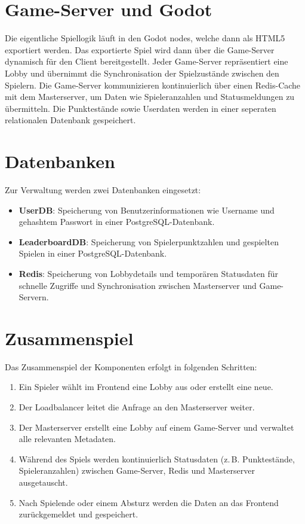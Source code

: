 \section{Game-Server und Godot}
Die eigentliche Spiellogik läuft in den Godot nodes, welche dann als HTML5 exportiert werden.
Das exportierte Spiel wird dann über die Game-Server dynamisch für den Client bereitgestellt. 
Jeder Game-Server repräsentiert eine Lobby und übernimmt die Synchronisation der Spielzustände zwischen den Spielern. 
Die Game-Server kommunizieren kontinuierlich über einen Redis-Cache mit dem Masterserver, um Daten wie Spieleranzahlen und Statusmeldungen zu übermitteln.
Die Punktestände sowie Userdaten werden in einer seperaten relationalen Datenbank gespeichert.

\section{Datenbanken}
Zur Verwaltung werden zwei Datenbanken eingesetzt:
\begin{itemize}
  \item \textbf{UserDB}: Speicherung von Benutzerinformationen wie Username und gehashtem Passwort in einer PostgreSQL-Datenbank. 
  \item \textbf{LeaderboardDB}: Speicherung von Spielerpunktzahlen und gespielten Spielen in einer PostgreSQL-Datenbank.
  \item \textbf{Redis}: Speicherung von Lobbydetails und temporären Statusdaten für schnelle Zugriffe und Synchronisation zwischen Masterserver und Game-Servern.
\end{itemize}

\section{Zusammenspiel}
Das Zusammenspiel der Komponenten erfolgt in folgenden Schritten:
\begin{enumerate}
  \item Ein Spieler wählt im Frontend eine Lobby aus oder erstellt eine neue.
  \item Der Loadbalancer leitet die Anfrage an den Masterserver weiter.
  \item Der Masterserver erstellt eine Lobby auf einem Game-Server und verwaltet alle relevanten Metadaten.
  \item Während des Spiels werden kontinuierlich Statusdaten (z.\,B. Punktestände, Spieleranzahlen) zwischen Game-Server, Redis und Masterserver ausgetauscht.
  \item Nach Spielende oder einem Absturz werden die Daten an das Frontend zurückgemeldet und gespeichert.
\end{enumerate}